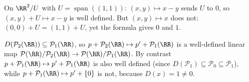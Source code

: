 \documentclass[10pt]{scrartcl}
\DeclareMathOperator{\spn}{span}\DeclareMathOperator{\nul}{null}\DeclareMathOperator{\range}{range}
\newcommand{\PP}{\mathcal P}\newcommand{\LL}{\mathcal L}\newcommand{\MM}{\mathcal M}\newcommand{\T}{\mathsf T}
\begin{document}
\begin{example*}
  On $\RR^2/U$ with $U=\spn((1,1))$: $(x,y)\mapsto x-y$ sends $U$ to $0$, so $(x,y)+U\mapsto x-y$ is well defined. But $(x,y)\mapsto x$ does not: $(0,0)+U=(1,1)+U$, yet the formula gives $0$ and $1$.
\end{example*}

\begin{example*}
  $D(\PP_2(\RR))\subseteq\PP_1(\RR)$, so $p+\PP_2(\RR)\mapsto p'+\PP_1(\RR)$ is a well-defined linear map $\PP(\RR)/\PP_2(\RR)\to\PP(\RR)/\PP_1(\RR)$. By contrast $p+\PP_1(\RR)\mapsto p'+\PP_1(\RR)$ is also well defined (since $D(\PP_1)\subseteq\PP_0\subseteq\PP_1$), while $p+\PP_1(\RR)\mapsto p'+\{0\}$ is not, because $D(x)=1\ne0$.
\end{example*}
\end{document}
